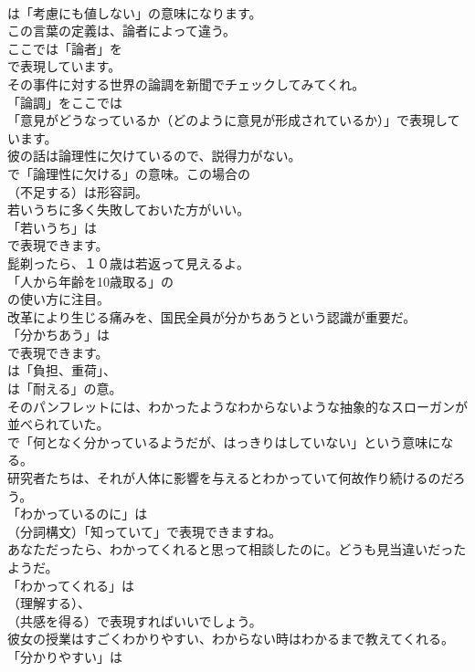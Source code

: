 \documentclass[8pt]{extreport}
\begin{document}
\begin{CJK}{UTF8}{min}
\\	は「考慮にも値しない」の意味になります。	
\\	この言葉の定義は、論者によって違う。 
\\	ここでは「論者」を 
\\	で表現しています。	
\\	その事件に対する世界の論調を新聞でチェックしてみてくれ。 
\\	「論調」をここでは
\\	「意見がどうなっているか（どのように意見が形成されているか）」で表現しています。	
\\	彼の話は論理性に欠けているので、説得力がない。 
\\	で「論理性に欠ける」の意味。この場合の
\\	（不足する）は形容詞。	
\\	若いうちに多く失敗しておいた方がいい。 
\\	「若いうち」は
\\	で表現できます。	
\\	髭剃ったら、１０歳は若返って見えるよ。 
\\	「人から年齢を10歳取る」の
\\	の使い方に注目。	
\\	改革により生じる痛みを、国民全員が分かちあうという認識が重要だ。 
\\	「分かちあう」は 
\\	で表現できます。
\\	は「負担、重荷」、
\\	は「耐える」の意。	
\\	そのパンフレットには、わかったようなわからないような抽象的なスローガンが並べられていた。 
\\	で「何となく分かっているようだが、はっきりはしていない」という意味になる。	
\\	研究者たちは、それが人体に影響を与えるとわかっていて何故作り続けるのだろう。 
\\	「わかっているのに」は
\\	（分詞構文）「知っていて」で表現できますね。	
\\	あなただったら、わかってくれると思って相談したのに。どうも見当違いだったようだ。 
\\	「わかってくれる」は 
\\	（理解する）、
\\	（共感を得る）で表現すればいいでしょう。	
\\	彼女の授業はすごくわかりやすい、わからない時はわかるまで教えてくれる。 
\\	「分かりやすい」は

\end{CJK}
\end{document}
